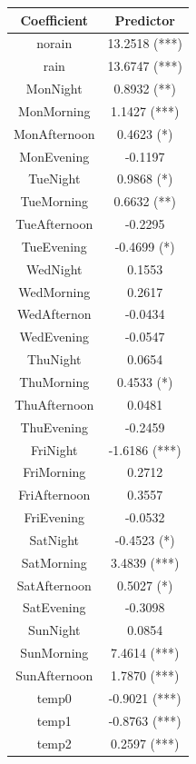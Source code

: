 \documentclass[twoside,11pt]{article}
\begin{document}
\begin{table}[H]
    \centering
    \begin{tabular}{c|c}
        Coefficient & Predictor \\ 
        \hline
        \hline
        norain & 13.2518 (***) \\
        rain & 13.6747 (***) \\
        MonNight & 0.8932 (**) \\
        MonMorning & 1.1427 (***) \\
        MonAfternoon & 0.4623 (*) \\
        MonEvening & -0.1197 \\
        TueNight & 0.9868 (*) \\
        TueMorning & 0.6632 (**) \\
        TueAfternoon & -0.2295 \\
        TueEvening & -0.4699 (*) \\
        WedNight & 0.1553 \\
        WedMorning & 0.2617 \\
        WedAfternon & -0.0434 \\
        WedEvening & -0.0547 \\
        ThuNight & 0.0654 \\
        ThuMorning & 0.4533 (*) \\
        ThuAfternoon & 0.0481 \\
        ThuEvening & -0.2459 \\
        FriNight & -1.6186 (***)\\
        FriMorning & 0.2712 \\
        FriAfternoon & 0.3557 \\
        FriEvening & -0.0532 \\
        SatNight & -0.4523 (*) \\
        SatMorning & 3.4839 (***) \\
        SatAfternoon & 0.5027 (*) \\
        SatEvening & -0.3098 \\
        SunNight &  0.0854 \\
        SunMorning & 7.4614 (***) \\
        SunAfternoon & 1.7870 (***) \\
        temp0 & -0.9021 (***) \\
        temp1 & -0.8763 (***) \\
        temp2 & 0.2597 (***) \\

\end{tabular}
\end{table}
\end{document}
